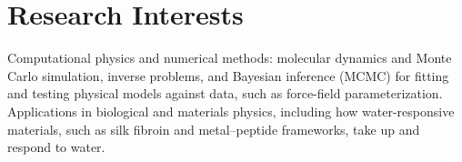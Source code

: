 \section{Research Interests}

Computational physics and numerical methods: molecular dynamics and Monte Carlo
simulation, inverse problems, and Bayesian inference (MCMC) for fitting and
testing physical models against data, such as force-field parameterization.
Applications in biological and materials physics, including how water-responsive materials,
such as silk fibroin and metal--peptide frameworks, take up and respond to water.
